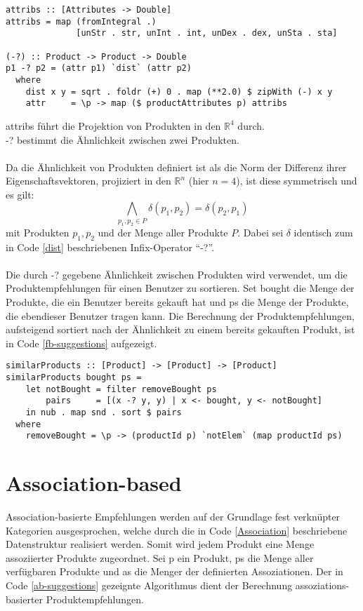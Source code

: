 \begin{lstlisting}[label=dist,caption={Algorithmus zur Berechnung der Ähnlichkeit von Produkten}]
attribs :: [Attributes -> Double]
attribs = map (fromIntegral .)
              [unStr . str, unInt . int, unDex . dex, unSta . sta]

(-?) :: Product -> Product -> Double
p1 -? p2 = (attr p1) `dist` (attr p2)
  where
    dist x y = sqrt . foldr (+) 0 . map (**2.0) $ zipWith (-) x y
    attr     = \p -> map ($ productAttributes p) attribs
\end{lstlisting}
\textsf{attribs} führt die Projektion von Produkten in den $\mathbb{R}^4$ durch. \\
\textsf{-?} bestimmt die Ähnlichkeit zwischen zwei Produkten.\\
\\
Da die Ähnlichkeit von Produkten definiert ist als die Norm der Differenz ihrer Eigenschaftsvektoren, projiziert in den $\mathbb{R}^n$ (hier $n = 4$), ist diese symmetrisch und es gilt:
\begin{equation}
  \bigwedge_{p_1, p_2 \in P} \delta\left(p_1, p_2\right) = \delta\left(p_2, p_1\right)
\end{equation}
mit Produkten $p_1, p_2$ und der Menge aller Produkte $P$. Dabei sei $\delta$ identisch zum in Code \ref{dist} beschriebenen Infix-Operator \enquote{\textsf{-?}}.\\
\\
Die durch \textsf{-?} gegebene Ähnlichkeit zwischen Produkten wird verwendet, um die Produktempfehlungen für einen Benutzer zu sortieren. Set \textsf{bought} die Menge der Produkte, die ein Benutzer bereits gekauft hat und \textsf{ps} die Menge der Produkte, die ebendieser Benutzer tragen kann. Die Berechnung der Produktempfehlungen, aufsteigend sortiert nach der Ähnlichkeit zu einem bereits gekauften Produkt, ist in Code \ref{fb-suggestions} aufgezeigt.

\begin{lstlisting}[label=fb-suggestions,caption={Algorithmus zur Generierung feature-basierter Produktempfehlungen}]
similarProducts :: [Product] -> [Product] -> [Product]
similarProducts bought ps = 
    let notBought = filter removeBought ps
        pairs     = [(x -? y, y) | x <- bought, y <- notBought]
    in nub . map snd . sort $ pairs
  where
    removeBought = \p -> (productId p) `notElem` (map productId ps)
\end{lstlisting}


\section{Association-based}
Association-basierte Empfehlungen werden auf der Grundlage fest verknüpter Kategorien ausgesprochen, welche durch die in Code \ref{Association} beschriebene Datenstruktur realisiert werden. Somit wird jedem Produkt eine Menge assoziierter Produkte zugeordnet. Sei \textsf{p} ein Produkt, \textsf{ps} die Menge aller verfügbaren Produkte und \textsf{as} die Menger der definierten Assoziationen. Der in Code \ref{ab-suggestions} gezeignte Algorithmus dient der Berechnung assoziations-basierter Produktempfehlungen.

